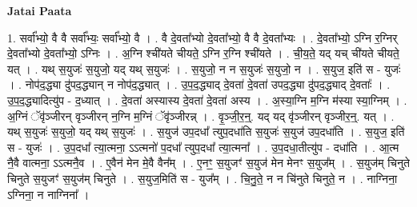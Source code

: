 \documentclass[17pt]{extarticle}
\begin{document}
\textbf{Jatai Paata} \newline

1. सर्वा᳚भ्यो॒ वै वै सर्वा᳚भ्यः॒ सर्वा᳚भ्यो॒ वै । . वै दे॒वता᳚भ्यो दे॒वता᳚भ्यो॒ वै वै दे॒वता᳚भ्यः । . दे॒वता᳚भ्यो॒ ऽग्नि र॒ग्निर् दे॒वता᳚भ्यो दे॒वता᳚भ्यो॒ ऽग्निः । . अ॒ग्नि श्ची॑यते चीयते॒ ऽग्नि र॒ग्नि श्ची॑यते । . ची॒य॒ते॒ यद् यच् ची॑यते चीयते॒ यत् । . यथ् स॒युजः॑ स॒युजो॒ यद् यथ् स॒युजः॑ । . स॒युजो॒ न न स॒युजः॑ स॒युजो॒ न । . स॒युज॒ इति॑ स - युजः॑ । . नोप॑द॒द्ध्या दु॑पद॒द्ध्यान् न नोप॑द॒द्ध्यात् । . उ॒प॒द॒द्ध्याद् दे॒वता॑ दे॒वता॑ उपद॒द्ध्या दु॑पद॒द्ध्याद् दे॒वताः᳚ । . उ॒प॒द॒द्ध्यादित्यु॑प - द॒ध्यात् । . दे॒वता॑ अस्यास्य दे॒वता॑ दे॒वता॑ अस्य । . अ॒स्या॒ग्नि म॒ग्नि म॑स्या स्या॒ग्निम् । . अ॒ग्निं ॅवृ॑ञ्जीरन् वृञ्जीरन् न॒ग्नि म॒ग्निं ॅवृ॑ञ्जीरन्न् । . वृ॒ञ्जी॒र॒न्॒. यद् यद् वृ॑ञ्जीरन् वृञ्जीर॒न्॒. यत् । . यथ् स॒युजः॑ स॒युजो॒ यद् यथ् स॒युजः॑ । . स॒युज॑ उप॒दधा᳚ त्युप॒दधा॑ति स॒युजः॑ स॒युज॑ उप॒दधा॑ति । . स॒युज॒ इति॑ स - युजः॑ । . उ॒प॒दधा᳚ त्या॒त्मना॒ ऽऽत्मनो॑ प॒दधा᳚ त्युप॒दधा᳚ त्या॒त्मना᳚ । . उ॒प॒दधा॒तीत्यु॑प - दधा॑ति । . आ॒त्म नै॒वै वात्मना॒ ऽऽत्मनै॒व । . ए॒वैन॑ मेन मे॒वै वैन᳚म् । . ए॒नꣳ॒॒ स॒युजꣳ॑ स॒युज॑ मेन मेनꣳ स॒युज᳚म् । . स॒युज॑म् चिनुते चिनुते स॒युजꣳ॑ स॒युज॑म् चिनुते । . स॒युज॒मिति॑ स - युज᳚म् । . चि॒नु॒ते॒ न न चि॑नुते चिनुते॒ न । . नाग्निना॒ ऽग्निना॒ न नाग्निना᳚ । \newline
\end{document}
